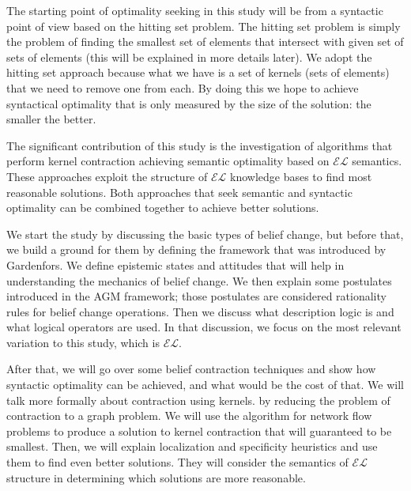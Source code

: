 The starting point of optimality seeking in this study will be from a syntactic point of view based on the hitting set problem. The hitting set problem is simply the problem of finding the smallest set of elements that intersect with given set of sets of elements (this will be explained in more details later). We adopt the hitting set approach because what we have is a set of kernels (sets of elements) that we need to remove one from each. By doing this we hope to achieve syntactical optimality that is only measured by the size of the solution: the smaller the better. 

The significant contribution of this study is the investigation of algorithms that perform kernel contraction achieving semantic optimality based on $\mathcal{EL}$ semantics. These approaches exploit the structure of $\mathcal{EL}$ knowledge bases to find most reasonable solutions. Both approaches that seek semantic and syntactic optimality can be combined together to achieve better solutions.

We start the study by discussing the basic types of belief change, but before that, we build a ground for them by defining the framework that was introduced by Gardenfors. We define epistemic states and attitudes that will help in understanding the mechanics of belief change. We then explain some postulates introduced in the AGM framework; those postulates are considered rationality rules for belief change operations. Then we discuss what description logic is and what logical operators are used. In that discussion, we focus on the most relevant variation to this study, which is $\mathcal{EL}$. 

After that, we will go over some belief contraction techniques and show how syntactic optimality can be achieved, and what would be the cost of that. We will talk more formally about contraction using kernels. by reducing the problem of contraction to a graph problem. We will use the algorithm for network flow problems to produce a solution to kernel contraction that will guaranteed to be smallest. Then, we will explain localization and specificity heuristics and use them to find even better solutions. They will consider the semantics of $\mathcal{EL}$ structure in determining which solutions are more reasonable. 
